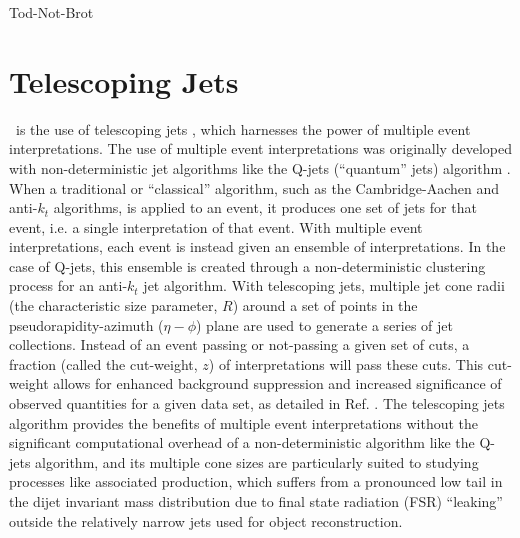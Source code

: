 \begin{savequote}[75mm]
Tod-Not-Brot
\end{savequote}

\chapter{Telescoping Jets}
\label{ch:teljet}
 \ZH\, is the use of telescoping jets \cite{teljet}, which harnesses the power of multiple event interpretations.  The use of multiple event interpretations was originally developed with non-deterministic jet algorithms like the Q-jets (``quantum'' jets) algorithm \cite{qjet}.  When a traditional or ``classical'' algorithm, such as the Cambridge-Aachen\cite{ca} and anti-$k_t$\cite{akt} algorithms, is applied to an event, it  produces one set of jets for that event, i.e. a single interpretation of that event.  With multiple event interpretations, each event is instead given an ensemble of interpretations.  In the case of Q-jets, this ensemble is created through a non-deterministic clustering process for an anti-$k_t$ jet algorithm.  With telescoping jets, multiple jet cone radii (the characteristic size parameter, $R$) around a set of points in the pseudorapidity-azimuth ($\eta-\phi$) plane are used to generate a series of jet collections.  Instead of an event passing or not-passing a given set of cuts, a fraction (called the cut-weight, $z$) of interpretations will pass these cuts.  This cut-weight allows for enhanced background suppression and increased significance of observed quantities for a given data set, as detailed in Ref. \cite{multint}.  The telescoping jets algorithm provides the benefits of multiple event interpretations without the significant computational overhead of a non-deterministic  algorithm like the Q-jets algorithm, and its multiple cone sizes are particularly suited to studying processes like associated production, which suffers from a pronounced low tail in the dijet invariant mass distribution due to final state radiation (FSR) ``leaking'' outside the relatively narrow jets used for object reconstruction. 

